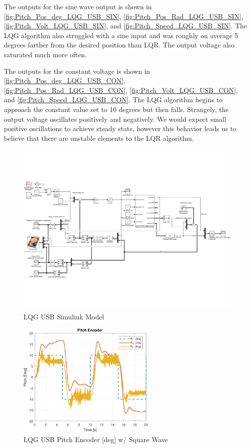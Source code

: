 \documentclass[fontsize=11pt, %
                             paper=letter, %
                             openany, %
                             captions=tableheading,
                             index=totoc,
                             hyperref]{labbook}
\begin{document}
\begin{addmargin}[0cm]{0cm}
The outputs for the sine wave output is shown in
\autoref{fig:Pitch_Pos_deg_LQG_USB_SIN},
\autoref{fig:Pitch_Pos_Rad_LQG_USB_SIN},
\autoref{fig:Pitch_Volt_LQG_USB_SIN}, and
\autoref{fig:Pitch_Speed_LQG_USB_SIN}.
The LQG algorithm also struggled with a sine input and was roughly on average 5 degrees farther from the desired position than LQR.  The output voltage also saturated much more often.

The outputs for the constant voltage is shown in
\autoref{fig:Pitch_Pos_deg_LQG_USB_CON},
\autoref{fig:Pitch_Pos_Rad_LQG_USB_CON},
\autoref{fig:Pitch_Volt_LQG_USB_CON}, and
\autoref{fig:Pitch_Speed_LQG_USB_CON}.
The LQG algorithm begins to approach the constant value set to 10 degrees but then falls.  Strangely, the output voltage oscillates positively and negatively.  We would expect small positive oscillations to achieve steady state, however this behavior leads us to believe that there are unstable elements to the LQR algorithm.

\begin{figure}[h]
  \centering
  \includegraphics[width=1\textwidth]{figs/img/LQG_USB_Quanser}
  \caption{LQG USB Simulink Model}
  \label{fig:LQG_USB}
\end{figure}

\begin{figure}[h]
  \centering
  \includegraphics[width=0.6\textwidth]{figs/matlab/LQG/LQG_USB/Pitch_Pos_deg_LQG_USB_SQU}
  \caption{LQG USB Pitch Encoder [deg] w/ Square Wave}
  \label{fig:Pitch_Pos_deg_LQG_USB_SQU}
\end{figure}


\end{addmargin}
\end{document}
